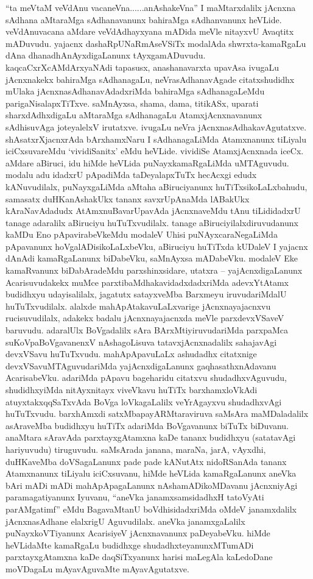 \begin{artha}
``ta meVtaM veVdAnu vacaneVna......anAshakeVna'' I maMtarxdalilx jAcnxna sAdhana aMtaraMga sAdhanavanunx bahiraMga sAdhanvanunx heVLide. veVdAnuvacana aMdare veVdAdhayxyana mADida meVle nitayxvU Avaqtitx mADuvudu. yajacnx dashaRpUNaRmAseVSiTx modalAda shwrxta-kamaRgaLu dAna dhanadhAnAyxdigaLanunx tAyxgamADuvudu. kaqcaCxrXcAMdArxyaNAdi tapasusx, anashanavarxta upavAsa ivugaLu jAcnxnakekx bahiraMga sAdhanagaLu, neVrasAdhanavAgade citatxshudidhx mUlaka jAcnxnasAdhanavAdadxriMda bahiraMga sAdhanagaLeMdu parigaNisalapxTiTxve. saMnAyxsa, shama, dama, titikASx, uparati sharxdAdhxdigaLu aMtaraMga sAdhanagaLu AtamxjAcnxnavanunx sAdhisuvAga joteyalelxV irutatxve. ivugaLu neVra jAcnxnasAdhakavAgutatxve. shAsatxrXjacnxrAda bArxhamxNaru I sAdhanagaLiMda Atamxnanunx tiLiyalu iciCxsuvareMdu `vividiSanitx' eMdu heVLide. vividiSe AtamxjAcnxnada iceCx. aMdare aBiruci, idu hiMde heVLida puNayxkamaRgaLiMda uMTAguvudu. modalu adu idadxrU pApadiMda taDeyalapxTuTx hecAcxgi edudx kANuvudilalx, puNayxgaLiMda aMtaha aBiruciyanunx huTiTxsikoLaLxbahudu, samasatx duHKanAshakUkx tananx savxrUpAnaMda lABakUkx kAraNavAdadudx AtAmxnuBavarUpavAda jAcnxnaveMdu tAnu tiLididadxrU tanage adaralilx aBiruciyu huTuTxvudilalx. tanage aBiruciyilalxdiruvudanunx kaMDu Eno pApavirabeVkeMdu modaleV Uhisi puNAyxcaraNegaLiMda pApavanunx hoVgalADisikoLaLxbeVku, aBiruciyu huTiTxda kUDaleV I yajacnx dAnAdi kamaRgaLanunx biDabeVku, saMnAyxsa mADabeVku. modaleV Eke kamaRvanunx biDabAradeMdu parxshinxsidare, utatxra {\rm --} yajAcnxdigaLanunx Acarisuvudakekx muMce parxtibaMdhakavidadxdadxriMda adevxYtAtamx budidhxyu udayisalilalx, jagatutx satayxveMba Barxmeyu iruvudariMdalU huTuTxvudilalx. alalxde mahApAtakavuLaLxvarige jAcnxnayajacnxvu rucisuvudilalx, adakekx badalu jAcnxnayajacnxda meVle parxdevxVSaveV baruvudu. adaralUlx BoVgadalilx sAra BArxMtiyiruvudariMda parxpaMca suKoVpaBoVgavanenxV nAshagoLisuva tatavxjAcnxnadalilx sahajavAgi devxVSavu huTuTxvudu. mahApApavuLaLx ashudadhx citatxnige devxVSavuMTAguvudariMda yajAcnxdigaLanunx gaqhasathxnAdavanu AcarisabeVku. adariMda pApavu bageharidu citatxvu shudadhxvAguvudu, shudidhxyiMda nitAyxnitayx viveVkavu huTiTx barxhamxloVkAdi atuyxtakxqqSaTxvAda BoVga loVkagaLalilx veYrAgayxvu shudadhxvAgi huTuTxvudu. barxhAmxdi satxMbapayARMtaraviruva saMsAra maMDaladalilx asAraveMba budidhxyu huTiTx adariMda BoVgavanunx biTuTx biDuvanu. anaMtara sAravAda parxtayxgAtamxna kaDe tananx budidhxyu (satatavAgi hariyuvudu) tiruguvudu. saMsArada janana, maraNa, jarA, vAyxdhi, duHKaveMba doVSagaLanunx pade pade kANutAtx nidoRSanAda tananx Atamxnanunx tiLiyalu iciCxsuvanu, hiMde heVLida kamaRgaLanunx aneVka bAri mADi mADi mahApApagaLanunx nAshamADikoMDavanu jAcnxniyAgi paramagatiyanunx Iyuvanu, ``aneVka janamxsamsidadhxH tatoVyAti parAMgatimf'' eMdu BagavaMtanU boVdhisidadxriMda oMdeV janamxdalilx jAcnxnasAdhane elalxrigU Aguvudilalx. aneVka janamxgaLalilx puNayxkoVTiyanunx AcarisiyeV jAcnxnavanunx paDeyabeVku. hiMde heVLidaMte kamaRgaLu budidhxge shudadhxteyanunxMTumADi parxtayxgAtamxna kaDe daqSiTxyanunx harisi maLegAla kaLedoDane moVDagaLu mAyavAguvaMte mAyavAgutatxve.
\end{artha}

